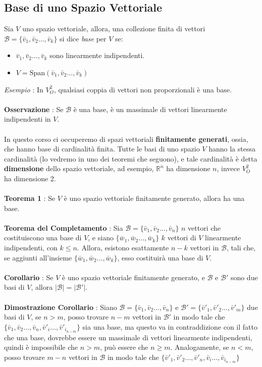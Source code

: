 \documentclass[12pt, letterpaper]{article}
\newcommand{\R}{{\mathbb R}}
\newcommand{\ve}{{\bar v}}
\newcommand{\acc}{\\\hphantom{}\\}
\newcommand{\Span}{{\text{Span}}}
\begin{document}
 \subsection{Base di uno Spazio Vettoriale}
Sia \(V\) uno spazio vettoriale, allora, una collezione finita 
di vettori \(\mathcal{B}=\{\ve_1,\ve_2\dots,\ve_k\}\) si dice \textit{base} per \(V\) se:\begin{itemize}
    \item \(\ve_1,\ve_2\dots,\ve_k\) sono linearmente indipendenti.
    \item \(V=\Span(\ve_1,\ve_2\dots,\ve_k)\)
\end{itemize}
\textit{Esempio }: In \(V_O^2\), qualsiasi coppia di vettori non proporzionali è una base.\acc
\textbf{Osservazione }: Se \(\mathcal{B}\) è una base, è un massimale di vettori 
linearmente indipendenti in \(V\).\acc 
In questo corso ci occuperemo di spazi vettoriali \textbf{finitamente generati}, ossia, che hanno 
base di cardinalità finita. Tutte le basi di uno spazio \(V\) hanno la stessa cardinalità (lo vedremo in uno 
dei teoremi che seguono), e tale cardinalità è detta \textbf{dimensione} dello spazio vettoriale, ad esempio, 
\(\R^n\) ha dimensione \(n\), invece \(V_O^2\) ha dimensione 2.\acc 
\textbf{Teorema 1} : Se \(V\) è uno spazio vettoriale finitamente generato, allora ha una base.\acc
\textbf{Teorema del Completamento} : Sia \(\mathcal{B}=\{\ve_1,\ve_2\dots,\ve_n\}\) \(n\) vettori che 
costituiscono una base di \(V\),
e siano \(\{\bar w_1,\bar w_2\dots,\bar w_k\}\) \(k\) vettori di \(V\) linearmente indipendenti, con 
\(k\le n\). Allora, esistono esattamente \(n-k\) vettori in \(\mathcal{B}\), tali che, se aggiunti all'insieme 
\(\{\bar w_1,\bar w_2\dots,\bar w_k\}\), esso costituirà una base di \(V\).\acc 
\textbf{Corollario }: Se \(V\) è uno spazio vettoriale finitamente generato, e \(\mathcal{B}\) e  
\(\mathcal{B}'\) sono due basi di \(V\), allora \(|\mathcal{B} |=|\mathcal{B}'|\).\acc 
\textbf{Dimostrazione Corollario} : Siano \(\mathcal{B}=\{\ve_1,\ve_2\dots,\ve_n\}\) e  
\(\mathcal{B}'=\{\ve'_1,\ve'_2\dots,\ve'_m\}\) due basi di \(V\), se \(n>m\), posso trovare 
\(n-m\) vettori in \(\mathcal{B}'\) in modo tale che \(\{\ve_1,\ve_2\dots,\ve_n,\ve'_i\dots,\ve'_{i_{n-m}}\}\)
sia una base, ma questo va in contraddizione con il fatto che una base, dovrebbe essere 
un massimale di vettori linearmente indipendenti, quindi è impossibile che \(n>m\), può essere che 
\(n\ge m\). Analogamente, se \(n<m\), posso trovare 
\(m-n\) vettori in \(\mathcal{B}\) in modo tale che \(\{\ve'_1,\ve'_2\dots,\ve'_n,\ve_i\dots,\ve_{i_{n-m}}\}\)
\end{document}
